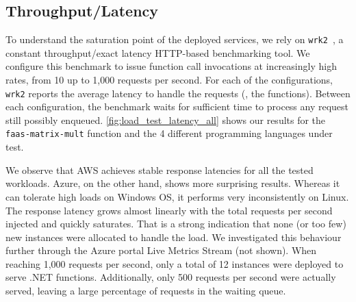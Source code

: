\subsection{Throughput/Latency}
\label{sec:loadtest}

To understand the saturation point of the deployed services, we rely on \texttt{wrk2}~\cite{wrk2}, a constant throughput/exact latency HTTP-based benchmarking tool.
We configure this benchmark to issue function call invocations at increasingly high rates, from 10 up to 1,000 requests per second.
For each of the configurations, \texttt{wrk2} reports the average latency to handle the requests (\ie, the functions).
Between each configuration, the benchmark waits for sufficient time to process any request still possibly enqueued.
\autoref{fig:load_test_latency_all} shows our results for the \texttt{faas-matrix-mult} function and the 4 different programming languages under test.

We observe that \gls{AWS} achieves stable response latencies for all the tested workloads. 
Azure, on the other hand, shows more surprising results.
Whereas it can tolerate high loads on Windows OS, it performs very inconsistently on Linux.
The response latency grows almost linearly with the total requests per second injected and quickly saturates. 
That is a strong indication that none (or too few) new instances were allocated to handle the load. 
We investigated this behaviour further through the Azure portal Live Metrics Stream (not shown). 
When reaching 1,000 requests per second, only a total of 12 instances were deployed to serve .NET functions. %
Additionally, only 500 requests per second were actually served, leaving a large percentage of requests in the waiting queue.

